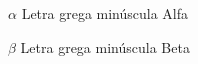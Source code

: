 \begin{simbolos}
	\item[$\alpha$] Letra grega minúscula Alfa
	\item[$\beta$] Letra grega minúscula Beta
\end{simbolos}